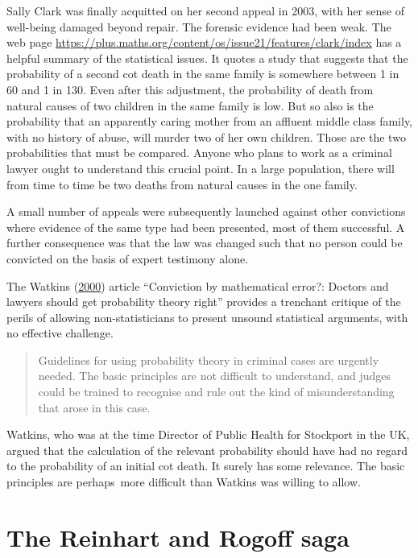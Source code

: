 \documentclass[
  10ptls,
  b5paper]{book}
\begin{document}
Sally Clark was finally acquitted on her second appeal in
2003, with her sense of well-being damaged beyond repair.
The forensic evidence had been weak. The web page
\url{https://plus.maths.org/content/os/issue21/features/clark/index}
has a helpful summary of the statistical issues. It
quotes a study that suggests that the probability of a
second cot death in the same family is somewhere between 1
in 60 and 1 in 130. Even after this adjustment, the
probability of death from natural causes of two children in
the same family is low. But so also is the probability that
an apparently caring mother from an affluent middle class
family, with no history of abuse, will murder two of her own
children. Those are the two probabilities that must be
compared. Anyone who plans to work as a criminal lawyer
ought to understand this crucial point. In a
large population, there will from time to time be two deaths
from natural causes in the one family.

A small number of appeals were subsequently launched against
other convictions where evidence of the same type had been
presented, most of them successful. A further consequence
was that the law was changed such that no person could be
convicted on the basis of expert testimony alone.

The Watkins (\protect\hyperlink{ref-watkins2000conviction}{2000}) article ``Conviction by mathematical
error?: Doctors and lawyers should get probability theory right''
provides a trenchant critique of the perils of allowing
non-statisticians to present unsound statistical arguments, with
no effective challenge.

\begin{quote}
Guidelines for using probability theory in criminal cases are urgently needed. The basic principles are not difficult to understand, and judges could be trained to recognise and rule out the kind of misunderstanding that arose in this case.
\end{quote}

Watkins, who was at the time Director of Public Health for Stockport
in the UK, argued that the calculation of the relevant probability
should have had no regard to the probability of an initial cot death.
It surely has some relevance. The basic principles are perhaps~more
difficult than Watkins was willing to allow.

\hypertarget{the-reinhart-and-rogoff-saga}{%
\section{The Reinhart and Rogoff saga}\label{the-reinhart-and-rogoff-saga}}
\end{document}
